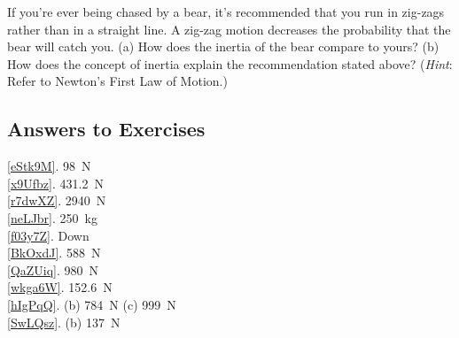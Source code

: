\documentclass[main.tex]{subfiles}
\begin{document}
\begin{exercise} \label{MB3Xar}
If you’re ever being chased by a bear, it’s recommended that you run in zig-zags rather than in a straight line. A zig-zag motion decreases the probability that the bear will catch you. (a) How does the inertia of the bear compare to yours? (b) How does the concept of inertia explain the recommendation stated above? (\textit{Hint}: Refer to Newton's First Law of Motion.)
\end{exercise}

\subsection{Answers to Exercises}

\ref{eStk9M}. \SI{98}{N}\\
\ref{x9Ufbz}. \SI{431.2}{N}\\
\ref{r7dwXZ}. \SI{2940}{N}\\
\ref{neLJbr}. \SI{250}{kg}\\
\ref{f03y7Z}. Down\\
\ref{BkOxdJ}. \SI{588}{N}\\
\ref{QaZUiq}. \SI{980}{N}\\
\ref{wkga6W}. \SI{152.6}{N}\\
\ref{hIgPqQ}. (b) \SI{784}{N} \hspace{1em} (c) \SI{999}{N}\\
\ref{SwLQsz}. (b) \SI{137}{N}\\
\end{document}
